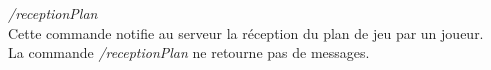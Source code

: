 \par

\textit{/receptionPlan} \\
Cette commande notifie au serveur la réception du plan de jeu par un joueur.\\

La commande \textit{/receptionPlan} ne retourne pas de messages.\\